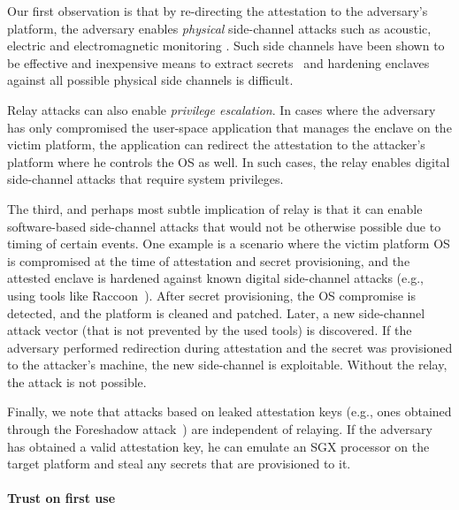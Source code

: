 
Our first observation is that by re-directing the attestation to the adversary's platform, the adversary enables \emph{physical} side-channel attacks such as acoustic, electric and electromagnetic monitoring . Such side channels have been shown to be effective and inexpensive means to extract secrets~\cite{genkin2016physical} and hardening enclaves against all possible physical side channels is difficult. 

Relay attacks can also enable \emph{privilege escalation}. In cases where the adversary has only compromised the user-space application that manages the enclave on the victim platform, the application can redirect the attestation to the attacker's platform where he controls the OS as well. In such cases, the relay enables digital side-channel attacks that require system privileges.

The third, and perhaps most subtle implication of relay is that it can enable software-based side-channel attacks that would not be otherwise possible due to timing of certain events. One example is a scenario where the victim platform OS is compromised at the time of attestation and secret provisioning, and the attested enclave is hardened against known digital side-channel attacks (e.g., using tools like Raccoon~\cite{raccoon}). After secret provisioning, the OS compromise is detected, and the platform is cleaned and patched. Later, a new side-channel attack vector (that is not prevented by the used tools) is discovered. If the adversary performed redirection during attestation and the secret was provisioned to the attacker's machine, the new side-channel is exploitable. Without the relay, the attack is not possible. 

Finally, we note that attacks based on leaked attestation keys (e.g., ones obtained through the Foreshadow attack~\cite{van2018foreshadow}) are independent of relaying. If the adversary has obtained a valid attestation key, he can emulate an SGX processor on the target platform and steal any secrets that are provisioned to it.


\paragraph{Trust on first use}

